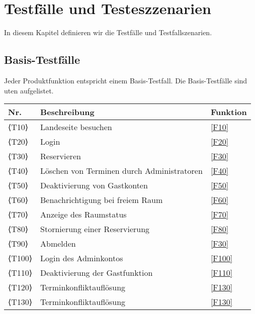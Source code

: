 \chapter{Testfälle und Testeszzenarien}
\label{chap:test}
In diesem Kapitel definieren wir die Testfälle und Testfallszenarien.

\section{Basis-Testfälle}

Jeder Produktfunktion entspricht einem Basis-Testfall. Die Basis-Testfälle sind uten aufgelistet.


\begin{table}[htbp]


  \centering
  \begin{tabularx}{\textwidth}{ l|X|l }
      \textbf{Nr.} & \textbf{Beschreibung} & \textbf{Funktion} \\ \hline\hline
      ⟨T10⟩ & Landeseite besuchen &\ref{F10}\\
      ⟨T20⟩ & Login &\ref{F20} \\
      ⟨T30⟩ & Reservieren &\ref{F30} \\
      ⟨T40⟩ & Löschen von Terminen durch Administratoren &\ref{F40} \\
      ⟨T50⟩ & Deaktivierung von Gastkonten &\ref{F50} \\
      ⟨T60⟩ & Benachrichtigung bei freiem Raum &\ref{F60} \\
      ⟨T70⟩ & Anzeige des Raumstatus &\ref{F70} \\
      ⟨T80⟩ & Stornierung einer Reservierung &\ref{F80} \\
      ⟨T90⟩ & Abmelden &\ref{F30} \\
      ⟨T100⟩& Login des Adminkontos &\ref{F100} \\
      ⟨T110⟩& Deaktivierung der Gastfunktion &\ref{F110} \\
      ⟨T120⟩ & Terminkonfliktauflösung &\ref{F130} \\
      ⟨T130⟩& Terminkonfliktauflösung &\ref{F130} \\
  \end{tabularx}\label{tab:test_table}
\end{table}

